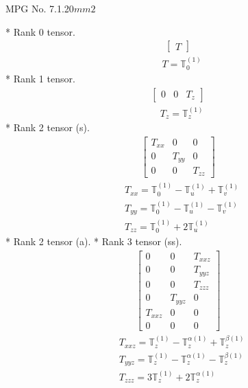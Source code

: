 \documentclass[fleqn,8pt,landscape]{jsarticle}
\begin{document}
\setcounter{MaxMatrixCols}{32}

\renewcommand{\tablename}{Table~}
\renewcommand{\figurename}{Figure~}
\begin{center}
\LARGE
MPG No. 7.1.20\quad$mm2$
\end{center}
* Rank 0 tensor.
\begin{align*}
\begin{bmatrix} T \end{bmatrix}
\end{align*}
\begin{align*}
& T = \mathbb{T}_{0}^{(1)}
\end{align*}
* Rank 1 tensor.
\begin{align*}
\begin{bmatrix} 0 & 0 & T_{z} \end{bmatrix}
\end{align*}
\begin{align*}
& T_{z} = \mathbb{T}_{z}^{(1)}
\end{align*}
* Rank 2 tensor (s).
\begin{align*}
\begin{bmatrix} T_{xx} & 0 & 0 \\ 0 & T_{yy} & 0 \\ 0 & 0 & T_{zz} \end{bmatrix}
\end{align*}
\begin{align*}
& T_{xx} = \mathbb{T}_{0}^{(1)} - \mathbb{T}_{u}^{(1)} + \mathbb{T}_{v}^{(1)} \\
& T_{yy} = \mathbb{T}_{0}^{(1)} - \mathbb{T}_{u}^{(1)} - \mathbb{T}_{v}^{(1)} \\
& T_{zz} = \mathbb{T}_{0}^{(1)} + 2 \mathbb{T}_{u}^{(1)}
\end{align*}
* Rank 2 tensor (a).
* Rank 3 tensor (ss).
\begin{align*}
\begin{bmatrix} 0 & 0 & T_{xxz} \\ 0 & 0 & T_{yyz} \\ 0 & 0 & T_{zzz} \\ 0 & T_{yyz} & 0 \\ T_{xxz} & 0 & 0 \\ 0 & 0 & 0 \end{bmatrix}
\end{align*}
\begin{align*}
& T_{xxz} = \mathbb{T}_{z}^{(1)} - \mathbb{T}_{z}^{\alpha(1)} + \mathbb{T}_{z}^{\beta(1)} \\
& T_{yyz} = \mathbb{T}_{z}^{(1)} - \mathbb{T}_{z}^{\alpha(1)} - \mathbb{T}_{z}^{\beta(1)} \\
& T_{zzz} = 3 \mathbb{T}_{z}^{(1)} + 2 \mathbb{T}_{z}^{\alpha(1)}
\end{align*}
\end{document}
